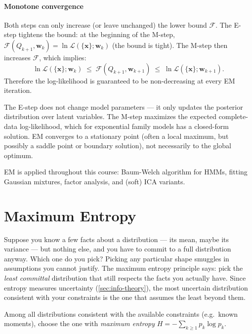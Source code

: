 \documentclass[11pt, oneside]{book}
\newcommand{\wvec}{\bm{w}}
\newcommand{\xvec}{\bm{x}}
\newcommand{\lhood}{\mathcal{L}}
\newcommand{\Fbound}{\mathcal{F}}
\begin{document}
\paragraph{Monotone convergence}
Both steps can only increase (or leave unchanged) the lower bound $\Fbound$.
The E-step tightens the bound: at the beginning of the M-step,
$\Fbound(Q_{k+1},\wvec_k) = \ln\lhood(\{\xvec\};\wvec_k)$ (the bound is tight).
The M-step then increases $\Fbound$, which implies:
\[
  \ln\lhood(\{\xvec\};\wvec_k) \;\leq\; \Fbound(Q_{k+1},\wvec_{k+1}) \;\leq\; \ln\lhood(\{\xvec\};\wvec_{k+1}).
\]
Therefore the log-likelihood is guaranteed to be non-decreasing at every EM iteration.

\begin{intbox}
  The E-step does not change model parameters --- it only updates the posterior
  distribution over latent variables. The M-step maximizes the expected complete-data
  log-likelihood, which for exponential family models has a closed-form solution.
  EM converges to a stationary point (often a local maximum, but possibly a saddle point
  or boundary solution), not necessarily to the global optimum.
\end{intbox}

EM is applied throughout this course: Baum-Welch algorithm for HMMs, fitting Gaussian
mixtures, factor analysis, and (soft) ICA variants.


\section{Maximum Entropy}
\label{sec:maxent}

Suppose you know a few facts about a distribution --- its mean, maybe its
variance --- but nothing else, and you have to commit to a full distribution
anyway.
Which one do you pick?
Picking any particular shape smuggles in assumptions you cannot justify.
The maximum entropy principle says: pick the \emph{least committal} distribution
that still respects the facts you actually have.
Since entropy measures uncertainty (\cref{sec:info-theory}), the most uncertain
distribution consistent with your constraints is the one that assumes the least
beyond them.

\begin{defbox}[title={Principle of Maximum Entropy}]
Among all distributions consistent with the available constraints (e.g.\ known
moments), choose the one with \emph{maximum entropy}
$H = -\sum_{k\ge1} p_k\log p_k$.
\end{defbox}
\end{document}
